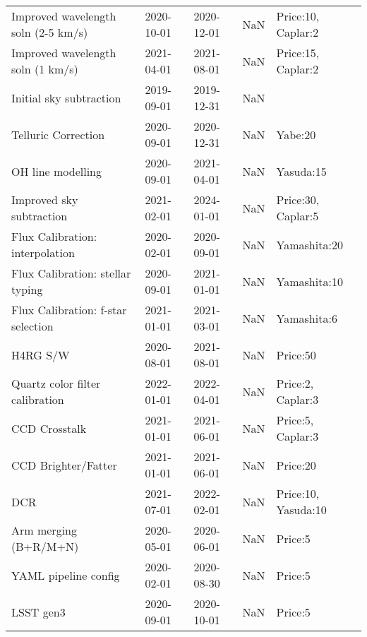 \begin{longtable}{lllp{2cm}l}
         Improved wavelength soln (2-5 km/s) &  2020-10-01 &  2020-12-01 &         NaN &      Price:10, Caplar:2 \\
           Improved wavelength soln (1 km/s) &  2021-04-01 &  2021-08-01 &         NaN &      Price:15, Caplar:2 \\
                     Initial sky subtraction &  2019-09-01 &  2019-12-31 &         NaN &                         \\
                         Telluric Correction &  2020-09-01 &  2020-12-31 &         NaN &                 Yabe:20 \\
                           OH line modelling &  2020-09-01 &  2021-04-01 &         NaN &               Yasuda:15 \\
                    Improved sky subtraction &  2021-02-01 &  2024-01-01 &         NaN &      Price:30, Caplar:5 \\
             Flux Calibration: interpolation &  2020-02-01 &  2020-09-01 &         NaN &            Yamashita:20 \\
            Flux Calibration: stellar typing &  2020-09-01 &  2021-01-01 &         NaN &            Yamashita:10 \\
          Flux Calibration: f-star selection &  2021-01-01 &  2021-03-01 &         NaN &             Yamashita:6 \\
                                    H4RG S/W &  2020-08-01 &  2021-08-01 &         NaN &                Price:50 \\
             Quartz color filter calibration &  2022-01-01 &  2022-04-01 &         NaN &       Price:2, Caplar:3 \\
                               CCD Crosstalk &  2021-01-01 &  2021-06-01 &         NaN &       Price:5, Caplar:3 \\
                         CCD Brighter/Fatter &  2021-01-01 &  2021-06-01 &         NaN &                Price:20 \\
                                         DCR &  2021-07-01 &  2022-02-01 &         NaN &     Price:10, Yasuda:10 \\
                       Arm merging (B+R/M+N) &  2020-05-01 &  2020-06-01 &         NaN &                 Price:5 \\
                        YAML pipeline config &  2020-02-01 &  2020-08-30 &         NaN &                 Price:5 \\
                                   LSST gen3 &  2020-09-01 &  2020-10-01 &         NaN &                 Price:5 \\
\end{longtable}
